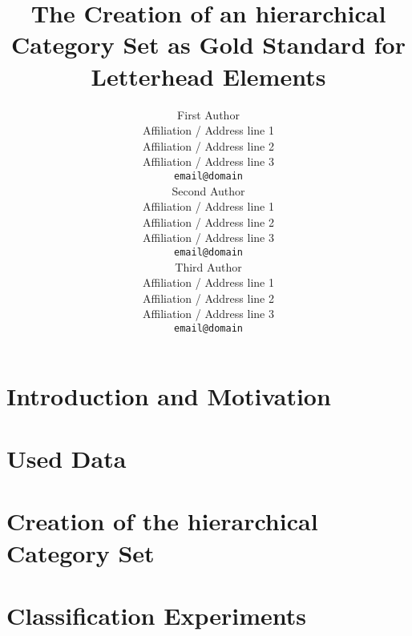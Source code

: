 \documentclass[11pt,a4paper]{article}
\title{The Creation of an hierarchical Category Set as Gold Standard for Letterhead Elements}
\author{First Author \\
  Affiliation / Address line 1 \\
  Affiliation / Address line 2 \\
  Affiliation / Address line 3 \\
  {\tt email@domain} \\\And
  Second Author \\
  Affiliation / Address line 1 \\
  Affiliation / Address line 2 \\
  Affiliation / Address line 3 \\
  {\tt email@domain} \\\And
  Third Author \\
  Affiliation / Address line 1 \\
  Affiliation / Address line 2 \\
  Affiliation / Address line 3 \\
  {\tt email@domain} \\}
\date{}
\begin{document}
\maketitle

\begin{abstract}
 
\end{abstract}

\section{Introduction and Motivation}
 \label{sec:Introduction and Motivation}
 


\section{Used Data}
 \label{sec:Used Data}
 


\section{Creation of the hierarchical Category Set}
 \label{sec:Creation of the hierarchical Category Set}
 


\section{Classification Experiments}
 \label{sec:Classification Experiments}
 

\end{document}
